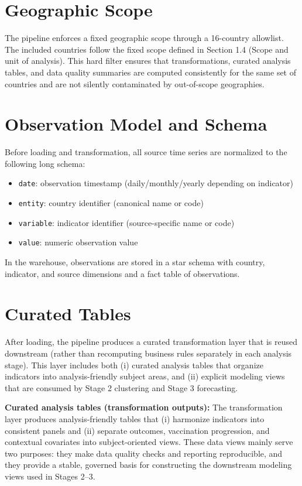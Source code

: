 \documentclass[a4paper]{report}
\begin{document}
\section{Geographic Scope}
The pipeline enforces a fixed geographic scope through a 16-country allowlist.
The included countries follow the fixed scope defined in Section 1.4 (Scope and unit of analysis).
This hard filter ensures that transformations, curated analysis tables, and data quality summaries are computed consistently for the same set of countries and are not silently contaminated by out-of-scope geographies.

\section{Observation Model and Schema}
Before loading and transformation, all source time series are normalized to the following long schema:
\begin{itemize}
    \item \texttt{date}: observation timestamp (daily/monthly/yearly depending on indicator)
    \item \texttt{entity}: country identifier (canonical name or code)
    \item \texttt{variable}: indicator identifier (source-specific name or code)
    \item \texttt{value}: numeric observation value
\end{itemize}
In the warehouse, observations are stored in a star schema with country, indicator, and source dimensions and a fact table of observations.

\section{Curated Tables}
After loading, the pipeline produces a curated transformation layer that is reused downstream (rather than recomputing business rules separately in each analysis stage).
This layer includes both (i) curated analysis tables that organize indicators into analysis-friendly subject areas, and (ii) explicit modeling views that are consumed by Stage 2 clustering and Stage 3 forecasting.

\textbf{Curated analysis tables (transformation outputs):}
The transformation layer produces analysis-friendly tables that (i) harmonize indicators into consistent panels and (ii) separate outcomes, vaccination progression, and contextual covariates into subject-oriented views.
These data views mainly serve two purposes: they make data quality checks and reporting reproducible, and they provide a stable, governed basis for constructing the downstream modeling views used in Stages 2--3.
\end{document}

